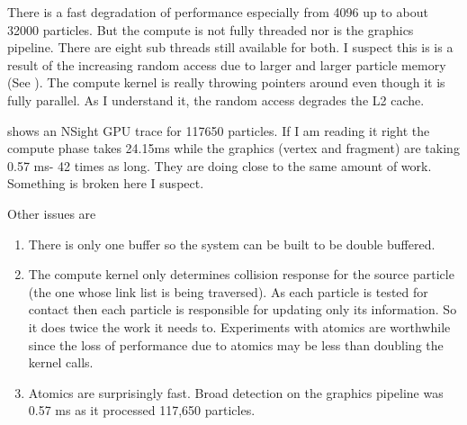 There is a fast degradation of performance especially from 4096 up to about 32000 particles. But the compute is not fully threaded nor is the graphics pipeline. 
There are eight sub threads still available for both. I suspect this is is a result of the increasing random access
due to larger and larger particle memory (See ). The compute kernel is really throwing pointers around even though it is fully parallel. 
As I understand it, the random access degrades the L2 cache.

 shows an NSight GPU trace for 117650 particles. If I am reading it right the compute phase takes 24.15ms while the graphics (vertex and fragment) are taking 0.57 ms- 42 times as long. They are doing close to the same amount of work. Something is broken here I suspect.

Other issues are 

\begin{enumerate}
\item There is only one buffer so the system can be built to be double buffered.
\item The compute kernel only determines collision response for the source particle (the one whose link list is being traversed). As each particle is tested for contact then each particle is responsible for updating only its information. So it does twice the work it needs to. Experiments with atomics are worthwhile since the loss of performance due to atomics may be less than doubling the kernel calls. 
\item Atomics are surprisingly fast. Broad detection on the graphics pipeline was 0.57 ms as it processed 117,650 particles.
\end{enumerate}

%
%
%
%
%
%
%

%
%
%
%
%

